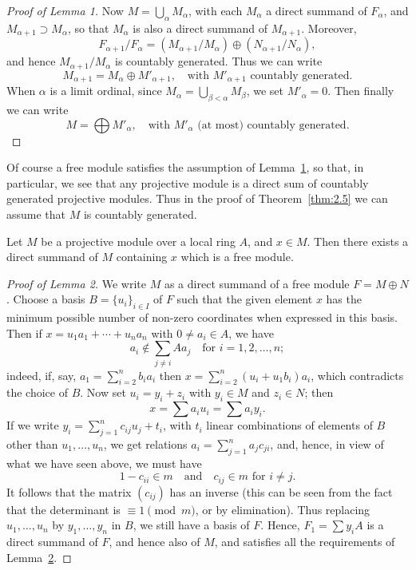 \begin{proof}[Proof of Lemma 1]
Now $M = \bigcup_\alpha M_\alpha$, with each $M_\alpha$ a direct summand of $F_\alpha$, and
$M_{\alpha+1} \supset M_\alpha$, so that $M_\alpha$ is also a direct summand of $M_{\alpha+1}$. Moreover,
\[
  F_{\alpha+1}/F_\alpha = (M_{\alpha+1}/M_\alpha) \oplus (N_{\alpha+1}/N_\alpha),
\]
and hence $M_{\alpha+1}/M_\alpha$ is countably generated. Thus we can write
\[
  M_{\alpha+1} = M_\alpha \oplus M'_{\alpha+1}, \quad \text{with } M'_{\alpha+1} \text{ countably generated}.
\]
When $\alpha$ is a limit ordinal, since $M_\alpha = \bigcup_{\beta<\alpha} M_\beta$, we set $M'_\alpha = 0$. Then finally
we can write
\[
  M = \bigoplus M'_\alpha, \quad \text{with } M'_\alpha \text{ (at most) countably generated.}
\]
\end{proof}

Of course a free module satisfies the assumption of Lemma~\hyperref[lem:2.1]{1}, so that,
in particular, we see that any projective module is a direct sum of countably
generated projective modules. Thus in the proof of Theorem~\ref{thm:2.5} we can
assume that $M$ is countably generated.

\begin{lemma}\label{lem:2.2}
Let $M$ be a projective module over a local ring $A$, and $x \in M$.
Then there exists a direct summand of $M$ containing $x$ which is a free
module.
\end{lemma}

\begin{proof}[Proof of Lemma 2]
\renewcommand{\qedsymbol}{}%
We write $M$ as a direct summand of a free module
$F = M \oplus N$. Choose a basis $B = \{u_i\}_{i \in I}$ of $F$ such that the given element
$x$ has the minimum possible number of non-zero coordinates when
expressed in this basis. Then if $x = u_1a_1 + \cdots + u_na_n$ with $0 \neq a_i \in A$, we have
\[
  a_i \notin \sum_{j \neq i} Aa_j \quad \text{for } i = 1, 2, \ldots, n;
\]
indeed, if, say, $a_1 = \sum_{i=2}^n b_ia_i$ then $x = \sum_{i=2}^n (u_i + u_1b_i)a_i$, which contradicts
the choice of $B$. Now set $u_i = y_i + z_i$ with $y_i \in M$ and $z_i \in N$; then
\[
  x = \sum a_iu_i = \sum a_iy_i.
\]
If we write $y_i = \sum_{j=1}^n c_{ij}u_j + t_i$, with $t_i$ linear combinations of elements of
$B$ other than $u_1, \ldots, u_n$, we get relations $a_i = \sum_{j=1}^n a_jc_{ji}$, and, hence, in view
of what we have seen above, we must have
\[
  1 - c_{ii} \in m \quad \text{and} \quad c_{ij} \in m \text{ for } i \neq j.
\]
It follows that the matrix $(c_{ij})$ has an inverse (this can be seen from the
fact that the determinant is $\equiv 1 \pmod m$, or by elimination). Thus replacing
$u_1, \ldots, u_n$ by $y_1, \ldots, y_n$ in $B$, we still have a basis of $F$. Hence, $F_1 = \sum y_iA$ is
a direct summand of $F$, and hence also of $M$, and satisfies all the
requirements of Lemma~\hyperref[lem:2.2]{2}.
\end{proof}

